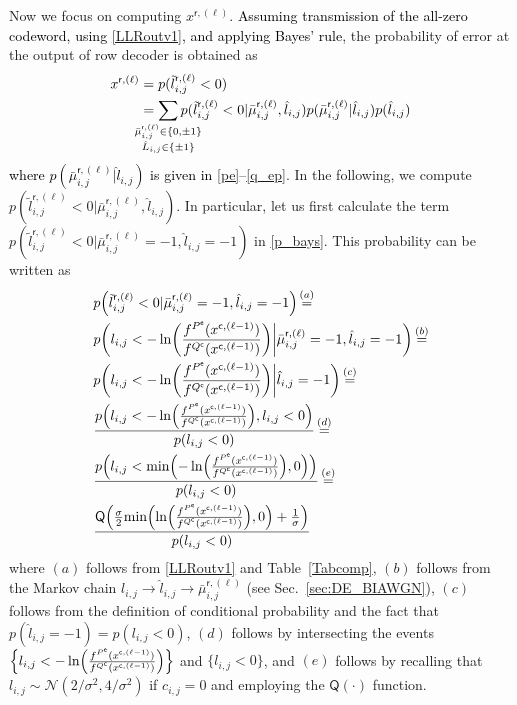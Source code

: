 \documentclass[journal]{IEEEtran}
\newcommand{\mep}{{x}}
\newcommand{\row}{\mathsf{r}}
\newcommand{\col}{\mathsf{c}}
\newcommand{\Q}{\mathsf{Q}}
\newcommand{\Pue}{P^{\mathsf{e}}}
\newcommand{\Quc}{Q^{\mathsf{c}}}
\newcommand{\opt}{\tilde{l}}
\newcommand{\AG}{\textcolor{black}}
\newcommand\myeqa{\stackrel{\mathclap{\normalfont\mbox{\scriptsize $(a)$}}}{=}}
\newcommand\myeqb{\stackrel{\mathclap{\normalfont\mbox{\scriptsize $(b)$}}}{=}}
\newcommand\myeqc{\stackrel{\mathclap{\normalfont\mbox{\scriptsize$(c)$}}}{=}}
\newcommand\myeqd{\stackrel{\mathclap{\normalfont\mbox{\scriptsize$(d)$}}}{=}}
\newcommand\myeqe{\stackrel{\mathclap{\normalfont\mbox{\scriptsize$(e)$}}}{=}}
\let\originalleft\left
\let\originalright\right
\renewcommand{\left}{\mathopen{}\mathclose\bgroup\originalleft}
\renewcommand{\right}{\aftergroup\egroup\originalright}
\begin{document}
Now we focus on computing $\mep^{\row,(\ell)}$. \AG{Assuming transmission of the all-zero codeword, using \eqref{LLRoutv1}, and applying Bayes' rule}, the probability of error at the output of row decoder is obtained as 
\begin{align}\label{p_bays} 
\mep^{\row,(\ell)} &= p(\opt_{i,j}^{\mathsf r, (\ell)}<0) \nonumber \\ &= \sum\limits_{\mathclap{\substack{
			{\bar \mu _{i,j}^{\row,(\ell )}\in \{ 0, \pm 1\} }\\
			{{{\hat L}_{i,j}}\in \{  \pm 1\} }}}} {p(\opt_{i,j}^{\mathsf r, (\ell)} < 0|\bar \mu _{i,j}^{\row,(\ell )},{{\hat l}_{i,j}})} p(\bar \mu _{i,j}^{\row,(\ell )}|{\hat l_{i,j}})p({\hat l_{i,j}})
\end{align}
\AG{where  $p(\bar \mu _{i,j}^{\row,(\ell )}|{\hat l_{i,j}})$ is given in \eqref{pe}--\eqref{q_ep}}. In the following, we compute ${p(\opt_{i,j}^{\mathsf r, (\ell)} < 0|\bar \mu _{i,j}^{\row,(\ell )},{{\hat l}_{i,j}})}$. In particular, let us first calculate the term ${p(\opt_{i,j}^{\mathsf r, (\ell)}< 0|\bar \mu _{i,j}^{\row,(\ell )}=-1,{{\hat l}_{i,j}=-1})}$ in \eqref{p_bays}. This probability can be written as
\begin{align}\label{p_baysd1} 
& \nonumber {p\left(\opt_{i,j}^{\mathsf r, (\ell)} < 0\lvert\bar \mu _{i,j}^{\row,(\ell )}=-1,{{\hat l}_{i,j}=-1}\right)}\myeqa \\ \nonumber & {p\left( l_{i,j} < -\ln \left( \frac{f^{\Pue}(\mep^{\col,(\ell-1)})}{f^{\Quc}(\mep^{\col,(\ell-1)})}\right)\bigg\lvert{\bar\mu _{i,j}^{\row,(\ell )}=-1,{\hat l}_{i,j}}=-1\right)}\myeqb  \\ \nonumber & {p\left( l_{i,j} < -\ln \left( \frac{f^{\Pue}(\mep^{\col,(\ell-1)})}{f^{\Quc}(\mep^{\col,(\ell-1)})}\right)\bigg\lvert{{\hat l}_{i,j}}=-1\right)}\myeqc \\ \nonumber & \frac{p\left(l_{i,j}<-\ln \left( \frac{f^{\Pue}(\mep^{\col,(\ell-1)})}{f^{\Quc}(\mep^{\col,(\ell-1)})}\right),l_{i,j}<0\right)}{p(l_{i,j}<0)} \myeqd \\ \nonumber & \frac{p\left(l_{i,j}<\text{min}\left(-\ln \left( \frac{f^{\Pue}(\mep^{\col,(\ell-1)})}{f^{\Quc}(\mep^{\col,(\ell-1)})}\right),0\right)\right)}{p(l_{i,j}<0)} \myeqe \\ & \frac{{\Q\left( { \frac{\sigma}{2}\text{min}\left(\ln \left( \frac{f^{\Pue}(\mep^{\col,(\ell-1)})}{f^{\Quc}(\mep^{\col,(\ell-1)})}\right),0\right)+\frac{1}{\sigma}} \right) }}{p(l_{i,j}<0)}
\end{align}
where $(a)$ follows from \eqref{LLRoutv1} and  Table~\ref{Tabcomp}, $(b)$ follows from the Markov chain $l_{i,j} \to \hat l_{i,j} \to \bar \mu _{i,j}^{\row,(\ell )}$ (see Sec.~\ref{sec:DE_BIAWGN}), $(c)$ follows from the definition of conditional probability and the fact that $p(\hat l_{i,j}=-1)=p(l_{i,j}<0)$, $(d)$ follows by intersecting the events $\Big\{l_{i,j}< -\ln \left( \frac{f^{\Pue}(\mep^{\col,(\ell-1)})}{f^{\Quc}(\mep^{\col,(\ell-1)})}\right)\Big\}$ and $\{l_{i,j}<0\}$, and $(e)$ follows by recalling that $l_{i,j}\sim\mathcal{N}(2/\sigma^2,4/\sigma^2)$ if $c_{i,j}=0$ and employing the $\Q(\cdot)$ function. 
\end{document}
